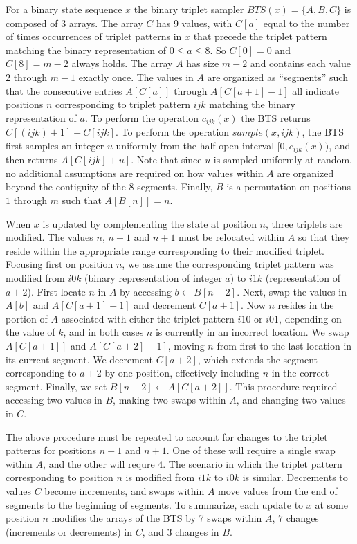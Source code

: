 \documentclass[11pt]{article}
\begin{document}
For a binary state sequence $x$ the binary triplet sampler
$\mathit{BTS}(x) = \{A, B, C\}$ is composed of 3 arrays. The array $C$
has 9 values, with $C[a]$ equal to the number of times occurrences of
triplet patterns in $x$ that precede the triplet pattern matching the
binary representation of $0\leq a \leq 8$. So $C[0] = 0$ and
$C[8] = m-2$ always holds. The array $A$ has size $m-2$ and contains
each value $2$ through $m-1$ exactly once. The values in $A$ are
organized as ``segments'' such that the consecutive entries $A[C[a]]$
through $A[C[a+1] - 1]$ all indicate positions $n$ corresponding to
triplet pattern $ijk$ matching the binary representation of $a$. To
perform the operation $c_{ijk}(x)$ the BTS returns
$C[(ijk)+1] - C[ijk]$. To perform the operation
$\mathit{sample}(x,ijk)$, the BTS first samples an integer $u$
uniformly from the half open interval $[0,c_{ijk}(x))$, and then
returns $A[C[ijk] + u]$. Note that since $u$ is sampled uniformly at
random, no additional assumptions are required on how values within
$A$ are organized beyond the contiguity of the 8 segments. Finally,
$B$ is a permutation on positions $1$ through $m$ such that
$A[B[n]] = n$.

When $x$ is updated by complementing the state at position $n$, three
triplets are modified.
The values $n$, $n-1$ and $n+1$ must be relocated within $A$ so that
they reside within the appropriate range corresponding to their
modified triplet. Focusing first on position $n$, we assume the
corresponding triplet pattern was modified from $i0k$ (binary
representation of integer $a$) to $i1k$ (representation of
$a+2$). First locate $n$ in $A$ by accessing $b \gets B[n-2]$. Next,
swap the values in $A[b]$ and $A[C[a+1]-1]$ and decrement $C[a+1]$.
Now $n$ resides in the portion of $A$ associated with either the
triplet pattern $i10$ or $i01$, depending on the value of $k$, and in
both cases $n$ is currently in an incorrect location. We swap
$A[C[a+1]]$ and $A[C[a+2]-1]$, moving $n$ from first to the last
location in its current segment. We decrement $C[a+2]$, which extends
the segment corresponding to $a+2$ by one position, effectively
including $n$ in the correct segment. Finally, we set
$B[n-2]\gets A[C[a+2]]$. This procedure required accessing two values
in $B$, making two swaps within $A$, and changing two values in $C$.

The above procedure must be repeated to account for changes to the
triplet patterns for positions $n-1$ and $n+1$. One of these will
require a single swap within $A$, and the other will requre $4$. The
scenario in which the triplet pattern corresponding to position $n$ is
modified from $i1k$ to $i0k$ is similar. Decrements to values $C$
become increments, and swaps within $A$ move values from the end of
segments to the beginning of segments. To summarize, each update to
$x$ at some position $n$ modifies the arrays of the BTS by 7 swaps
within $A$, $7$ changes (increments or decrements) in $C$, and 3
changes in $B$.
\end{document}
